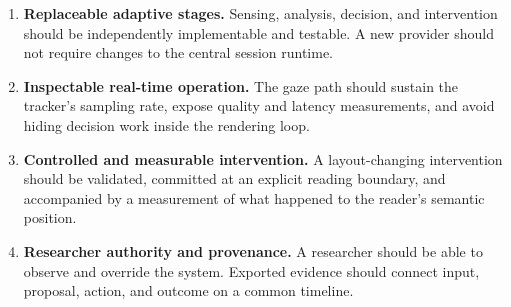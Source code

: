 \documentclass[sigconf,review,anonymous]{acmart}
\begin{document}
\begin{enumerate}
    \item \textbf{Replaceable adaptive stages.} Sensing, analysis, decision, and intervention should be independently implementable and testable. A new provider should not require changes to the central session runtime.
    \item \textbf{Inspectable real-time operation.} The gaze path should sustain the tracker's sampling rate, expose quality and latency measurements, and avoid hiding decision work inside the rendering loop.
    \item \textbf{Controlled and measurable intervention.} A layout-changing intervention should be validated, committed at an explicit reading boundary, and accompanied by a measurement of what happened to the reader's semantic position.
    \item \textbf{Researcher authority and provenance.} A researcher should be able to observe and override the system. Exported evidence should connect input, proposal, action, and outcome on a common timeline.
\end{enumerate}
\end{document}
